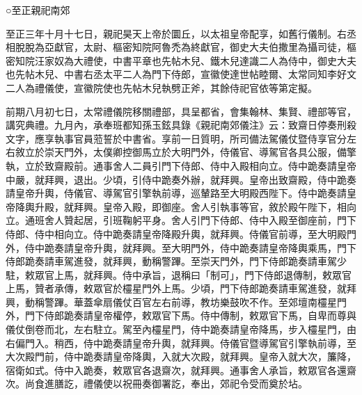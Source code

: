 
\begin{pinyinscope}

 ○至正親祀南郊



 至正三年十月十七日，親祀昊天上帝於圜丘，以太祖皇帝配享，如舊行儀制。右丞相脫脫為亞獻官，太尉、樞密知院阿魯禿為終獻官，御史大夫伯撒里為攝司徒，樞密知院汪家奴為大禮使，中書平章也先帖木兒、鐵木兒達識二人為侍中，御史大夫也先帖木兒、中書右丞太平二人為門下侍郎，宣徽使達世帖睦爾、太常同知李好文二人為禮儀使，宣徽院使也先帖木兒執劈正斧，其餘侍祀官依等第定擬。



 前期八月初七日，太常禮儀院移關禮部，具呈都省，會集翰林、集賢、禮部等官，講究典禮。九月內，承奉班都知孫玉鉉具錄《親祀南郊儀注》云：致齋日停奏刑殺文字，應享執事官員蒞誓於中書省。享前一日質明，所司備法駕儀仗暨侍享官分左右敘立於崇天門外，太僕卿控御馬立於大明門外，侍儀官、導駕官各具公服，備擎執，立於致齋殿前。通事舍人二員引門下侍郎、侍中入殿相向立。侍中跪奏請皇帝中嚴，就拜興，退出。少頃，引侍中跪奏外辦，就拜興。皇帝出致齋殿，侍中跪奏請皇帝升輿，侍儀官、導駕官引擎執前導，巡輦路至大明殿西陛下。侍中跪奏請皇帝降輿升殿，就拜興。皇帝入殿，即御座。舍人引執事等官，敘於殿午陛下，相向立。通班舍人贊起居，引班鞠躬平身。舍人引門下侍郎、侍中入殿至御座前，門下侍郎、侍中相向立。侍中跪奏請皇帝降殿升輿，就拜興。侍儀官前導，至大明殿門外，侍中跪奏請皇帝升輿，就拜興。至大明門外，侍中跪奏請皇帝降輿乘馬，門下侍郎跪奏請車駕進發，就拜興，動稱警蹕。至崇天門外，門下侍郎跪奏請車駕少駐，敕眾官上馬，就拜興。侍中承旨，退稱曰「制可」，門下侍郎退傳制，敕眾官上馬，贊者承傳，敕眾官於欞星門外上馬。少頃，門下侍郎跪奏請車駕進發，就拜興，動稱警蹕。華蓋傘扇儀仗百官左右前導，教坊樂鼓吹不作。至郊壇南欞星門外，門下侍郎跪奏請皇帝權停，敕眾官下馬。侍中傳制，敕眾官下馬，自卑而尊與儀仗倒卷而北，左右駐立。駕至內欞星門，侍中跪奏請皇帝降馬，步入欞星門，由右偏門入。稍西，侍中跪奏請皇帝升輿，就拜興。侍儀官暨導駕官引擎執前導，至大次殿門前，侍中跪奏請皇帝降輿，入就大次殿，就拜興。皇帝入就大次，簾降，宿衛如式。侍中入跪奏，敕眾官各退齋次，就拜興。通事舍人承旨，敕眾官各還齋次。尚食進膳訖，禮儀使以祝冊奏御署訖，奉出，郊祀令受而奠於坫。




\end{pinyinscope}
